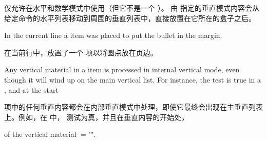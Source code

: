 \documentclass[twoside,letterpaper]{rapport3}
\begin{document}
仅允许在水平和数学模式中使用（但它不是一个 ）。
由  指定的垂直模式内容会从给定命令的水平列表移动到周围的垂直列表中，直接放置在它所在的盒子之后。

In the current line
a  item was placed to put the bullet in the margin.

在当前行中，放置了一个  项以将圆点放在页边。

Any vertical material in a  item is processed
in internal vertical mode, even though it will wind up
on the main vertical list. For instance, the 
test is true in a , and at the start

 项中的任何垂直内容都会在内部垂直模式中处理，即使它最终会出现在主垂直列表上。例如，在  中， 测试为真，并且在垂直内容的开始处，

\mdqon
of the vertical material $=$""\n{-1000pt}.
\mdqoff
\end{document}
